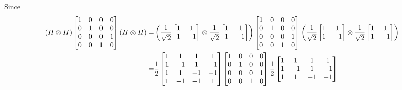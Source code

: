 \documentclass[en]{sol-man}
\begin{document}
\begin{pf}
    Since
    \begin{align}
        \notag(H\otimes H)\begin{bmatrix}
            1&0&0&0\\
            0&1&0&0\\
            0&0&0&1\\
            0&0&1&0
        \end{bmatrix}(H\otimes H)=&\left(\frac{1}{\sqrt{2}}\begin{bmatrix}
            1&1\\
            1&-1
        \end{bmatrix}\otimes\frac{1}{\sqrt{2}}\begin{bmatrix}
            1&1\\
            1&-1
        \end{bmatrix}\right)\begin{bmatrix}
            1&0&0&0\\
            0&1&0&0\\
            0&0&0&1\\
            0&0&1&0
        \end{bmatrix}\left(\frac{1}{\sqrt{2}}\begin{bmatrix}
            1&1\\
            1&-1
        \end{bmatrix}\otimes\frac{1}{\sqrt{2}}\begin{bmatrix}
            1&1\\
            1&-1
        \end{bmatrix}\right)\\
        =&\frac{1}{2}\begin{bmatrix}
            1&1&1&1\\
            1&-1&1&-1\\
            1&1&-1&-1\\
            1&-1&-1&1
        \end{bmatrix}\begin{bmatrix}
            1&0&0&0\\
            0&1&0&0\\
            0&0&0&1\\
            0&0&1&0
        \end{bmatrix}\frac{1}{2}\begin{bmatrix}
            1&1&1&1\\
            1&-1&1&-1\\
            1&1&-1&-1\\

\end{bmatrix}
\end{align}
\end{pf}
\end{document}
